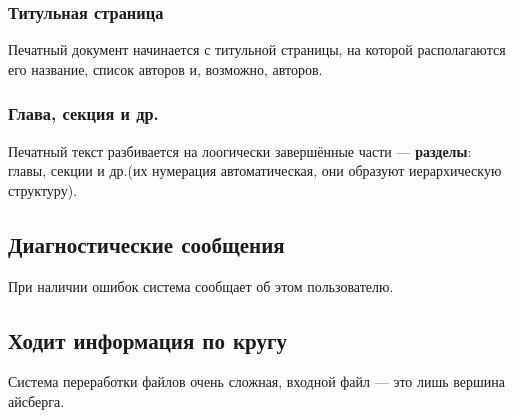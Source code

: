 \documentclass[a4paper,12pt]{article}
\begin{document}
\subsubsection{Титульная страница}
Печатный документ начинается с титульной страницы, на которой располагаются его название, список авторов и, возможно, авторов. 
\subsubsection{Глава, секция и др.}
Печатный текст разбивается на лоогически завершённые части --- {\bf разделы}: главы, секции и др.(их нумерация автоматическая, они образуют иерархическую структуру).
\subsection{Диагностические сообщения}
При наличии ошибок система сообщает об этом пользователю.
\subsection{Ходит информация по кругу}
Система переработки файлов  очень сложная, входной файл --- это лишь вершина айсберга.
\end{document}
